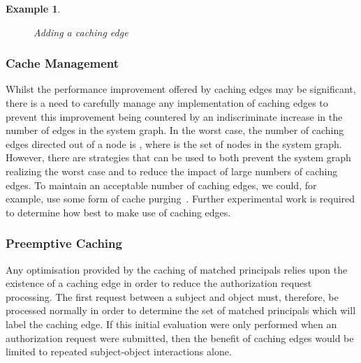 \documentclass{article}
\newtheorem{example}{Example}
\begin{document}
\begin{example}
\begin{figure}[!ht]
      \caption{Adding a caching edge}\label{img:system-graph-fragment1}
\end{figure}
\end{example}

\subsubsection{Cache Management}\label{sec:extended_typed_edges:caching_edges:management}
Whilst the performance improvement offered by caching edges may be significant, there is a need to carefully manage any implementation of caching edges to prevent this improvement being countered by an indiscriminate increase in the number of edges in the system graph.
In the worst case, the number of caching edges directed out of a node is , where  is the set of nodes in the system graph.
However, there are strategies that can be used to both prevent the system graph realizing the worst case and to reduce the impact of large numbers of caching edges.
To maintain an acceptable number of caching edges, we could, for example, use some form of cache purging~\cite{CramptonS14_STM}.
Further experimental work is required to determine how best to make use of caching edges.

\subsubsection{Preemptive Caching}\label{sec:extended_typed_edges:caching_edges:preemptive}
Any optimisation provided by the caching of matched principals relies upon the existence of a caching edge in order to reduce the authorization request processing.
The first request between a subject and object must, therefore, be processed normally in order to determine the set of matched principals which will label the caching edge.
If this initial evaluation were only performed when an authorization request were submitted, then the benefit of caching edges would be limited to repeated subject-object interactions alone.
\end{document}
